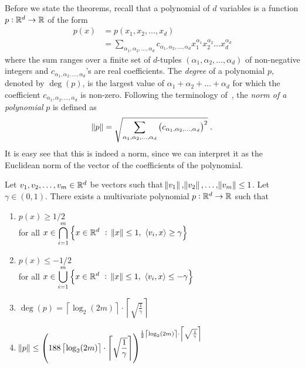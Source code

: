 Before we state the theorems, recall that a polynomial of $d$ variables is a
function $p:\mathbb{R}^d \to \mathbb{R}$ of the form
\begin{align*}
p(x)
& = p(x_1, x_2, \dots, x_d) \\
& = \sum_{\alpha_1, \alpha_2, \dots, \alpha_d} c_{\alpha_1, \alpha_2, \dots, \alpha_d} x_1^{\alpha_1} x_2^{\alpha_2} \dots x_d^{\alpha_d}
\end{align*}
where the sum ranges over a finite set of $d$-tuples $(\alpha_1, \alpha_2,
\dots, \alpha_d)$ of non-negative integers and $c_{\alpha_1, \alpha_2, \dots,
\alpha_d}$'s are real coefficients. The \emph{degree} of a polynomial $p$, denoted
by $\deg(p)$, is the largest value of $\alpha_1 + \alpha_2 + \dots + \alpha_d$
for which the coefficient $c_{\alpha_1, \alpha_2, \dots, \alpha_d}$ is non-zero.
Following the terminology of~\cite{Klivans-Servedio-2008},
the \emph{norm of a polynomial} $p$ is defined as
$$
\norm{p} = \sqrt{\sum_{\alpha_1, \alpha_2, \dots, \alpha_d} \left(c_{\alpha_1, \alpha_2, \dots, \alpha_d} \right)^2 } \; .
$$
It is easy see that this is indeed a norm, since we can interpret it as the
Euclidean norm of the vector of the coefficients of the polynomial.

\begin{theorem}
\label{theorem:polynomial-approximation-1}
Let $v_1, v_2, \dots, v_m \in \mathbb{R}^d$ be vectors such that $\norm{v_1},
\norm{v_2}, \dots, \norm{v_m} \le 1$. Let $\gamma \in (0,1)$. There exists a
multivariate polynomial $p:\mathbb{R}^d \to \mathbb{R}$ such that
\begin{enumerate}
\item $p(x) \ge 1/2$ \\ for all $\displaystyle x \in \bigcap_{i=1}^m \left\{ x \in \mathbb{R}^d ~:~ \norm{x} \le 1, \ \left\langle v_i, x \right\rangle \ge \gamma \right\}$
\item $p(x) \le -1/2$ \\ for all $\displaystyle x \in \bigcup_{i=1}^m \left\{ x \in \mathbb{R}^d ~:~ \norm{x} \le 1, \ \left\langle v_i, x \right\rangle \le - \gamma \right\}$
\item $\displaystyle \deg(p) = \left\lceil \log_2(2m) \right\rceil \cdot \left\lceil \sqrt{\frac{1}{\gamma}} \right\rceil$
\item $\displaystyle \norm{p} \le \left( 188 \left\lceil \log_2(2m) \right\rceil \cdot \left\lceil \sqrt{\frac{1}{\gamma}} \right\rceil \right)^{\frac{1}{2} \left\lceil \log_2(2m) \right\rceil \cdot \left\lceil \sqrt{\frac{1}{\gamma}} \right\rceil}$
\end{enumerate}
\end{theorem}

